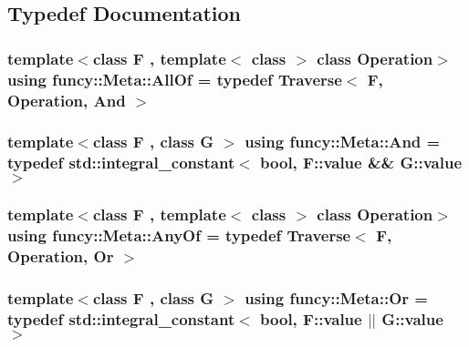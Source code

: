 \subsection{Typedef Documentation}
\hypertarget{namespacefuncy_1_1Meta_a7957593ba11cc9c461684ee7efbeb3c4}{
\subsubsection[{All\-Of}]{\setlength{\rightskip}{0pt plus 5cm}template$<$class F , template$<$ class $>$ class Operation$>$ using {\bf funcy\-::\-Meta\-::\-All\-Of} = typedef {\bf Traverse}$<$ F, Operation, {\bf And} $>$}}\label{namespacefuncy_1_1Meta_a7957593ba11cc9c461684ee7efbeb3c4}
\hypertarget{namespacefuncy_1_1Meta_a41cc898590e15dae8d6da038f55f3cd2}{
\subsubsection[{And}]{\setlength{\rightskip}{0pt plus 5cm}template$<$class F , class G $>$ using {\bf funcy\-::\-Meta\-::\-And} = typedef std\-::integral\-\_\-constant$<$ bool, F\-::value \&\& G\-::value $>$}}\label{namespacefuncy_1_1Meta_a41cc898590e15dae8d6da038f55f3cd2}
\hypertarget{namespacefuncy_1_1Meta_ad563ba73c1ea4946f6168ad527e02346}{
\subsubsection[{Any\-Of}]{\setlength{\rightskip}{0pt plus 5cm}template$<$class F , template$<$ class $>$ class Operation$>$ using {\bf funcy\-::\-Meta\-::\-Any\-Of} = typedef {\bf Traverse}$<$ F, Operation, {\bf Or} $>$}}\label{namespacefuncy_1_1Meta_ad563ba73c1ea4946f6168ad527e02346}
\hypertarget{namespacefuncy_1_1Meta_a7a832030d5229986a69d3518833e1b8f}{
\subsubsection[{Or}]{\setlength{\rightskip}{0pt plus 5cm}template$<$class F , class G $>$ using {\bf funcy\-::\-Meta\-::\-Or} = typedef std\-::integral\-\_\-constant$<$ bool, F\-::value $\vert$$\vert$ G\-::value $>$}}\label{namespacefuncy_1_1Meta_a7a832030d5229986a69d3518833e1b8f}

